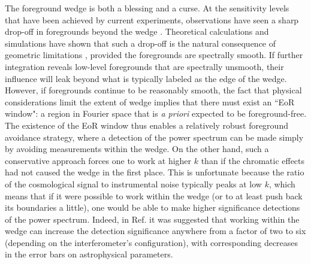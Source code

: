 \documentclass[twocolumn,aps,prd,nofootinbib,showpacs]{revtex4-1}
\begin{document}
The foreground wedge is both a blessing and a curse.  At the sensitivity levels that have been achieved by current experiments, observations have seen a sharp drop-off in foregrounds beyond the wedge \cite{Pober2013}.  Theoretical calculations and simulations have shown that such a drop-off is the natural consequence of geometric limitations \cite{Parsons2012b}, provided the foregrounds are spectrally smooth.  If further integration reveals low-level foregrounds that are spectrally unsmooth, their influence will leak beyond what is typically labeled as the edge of the wedge.  However, if foregrounds continue to be reasonably smooth, the fact that physical considerations limit the extent of wedge implies that there must exist an ``EoR window": a region in Fourier space that is \emph{a priori} expected to be foreground-free.  The existence of the EoR window thus enables a relatively robust foreground avoidance strategy, where a detection of the power spectrum can be made simply by avoiding measurements within the wedge.  On the other hand, such a conservative approach forces one to work at higher $k$ than if the chromatic effects had not caused the wedge in the first place.  This is unfortunate because the ratio of the cosmological signal to instrumental noise typically peaks at low $k$, which means that if it were possible to work within the wedge (or to at least push back its boundaries a little), one would be able to make higher significance detections of the power spectrum.  Indeed, in Ref. \cite{Pober2014} it was suggested that working within the wedge can increase the detection significance anywhere from a factor of two to six (depending on the interferometer's configuration), with corresponding decreases in the error bars on astrophysical parameters.
\end{document}
